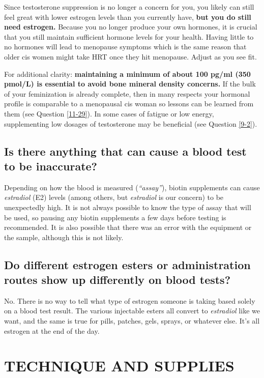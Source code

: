 \documentclass{article}
\begin{document}
Since testosterone suppression is no longer a concern for you, you likely can still feel great with lower estrogen levels than you currently have, \textbf{but you do still need estrogen.} Because you no longer produce your own hormones, it is crucial that you still maintain sufficient hormone levels for your health. Having little to no hormones will lead to menopause symptoms which is the same reason that older cis women might take HRT once they hit menopause. Adjust as you see fit.

For additional clarity: \textbf{maintaining a minimum of about 100 pg/ml (350 pmol/L) is essential to avoid bone mineral density concerns.} If the bulk of your feminization is already complete, then in many respects your hormonal profile is comparable to a menopausal cis woman so lessons can be learned from them (see Question \ref{11-29}). In some cases of fatigue or low energy, supplementing low dosages of testosterone may be beneficial (see Question \ref{9-2}).

\subsection{Is there anything that can cause a blood test to be inaccurate?}

Depending on how the blood is measured (\textit{“assay”}), biotin supplements can cause \textit{estradiol} (E2) levels (among others, but \textit{estradiol} is our concern) to be unexpectedly high. It is not always possible to know the type of assay that will be used, so pausing any biotin supplements a few days before testing is recommended. It is also possible that there was an error with the equipment or the sample, although this is not likely.

\subsection{Do different estrogen esters or administration routes show up differently on blood tests?}\label{4-16}

No. There is no way to tell what type of estrogen someone is taking based solely on a blood test result. The various injectable esters all convert to \textit{estradiol} like we want, and the same is true for pills, patches, gels, sprays, or whatever else. It's all estrogen at the end of the day.



\section{TECHNIQUE AND SUPPLIES}\label{ts}
\end{document}
